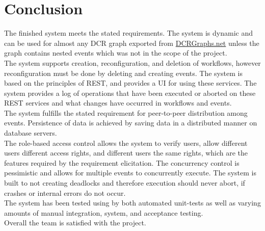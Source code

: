 \section{Conclusion}
The finished system meets the stated requirements. The system is dynamic and can be used for almost any DCR graph exported from \url{DCRGraphs.net} unless the graph contains nested events which was not in the scope of the project.  \\ 

The system supports creation, reconfiguration, and deletion of workflows, however reconfiguration must be done by deleting and creating events. The system is based on the principles of REST, and provides a UI for using these services. The system provides a log of operations that have been executed or aborted on these REST services and what changes have occurred in workflows and events. \\

The system fulfills the stated requirement for peer-to-peer distribution among events. Persistence of data is achieved by saving data in a distributed manner on database servers. \\ 

The role-based access control allows the system to verify users, allow different users different access rights, and different users the same rights, which are the features required by the requirement elicitation. The concurrency control is pessimistic and allows for multiple events to concurrently execute. The system is built to not creating deadlocks and therefore execution should never abort, if crashes or internal errors do not occur. \\ 

The system has been tested using by both automated unit-tests as well as varying amounts of manual integration, system, and acceptance testing.\\

Overall the team is satisfied with the project.
